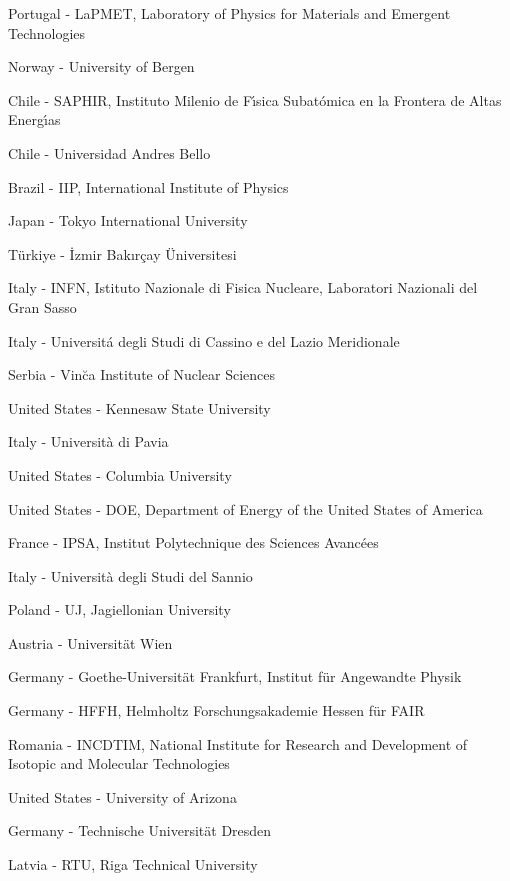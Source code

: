 \item[$^{339}$] Portugal - LaPMET, Laboratory of Physics for Materials and Emergent Technologies
\item[$^{340}$] Norway - University of Bergen
\item[$^{341}$] Chile - SAPHIR, Instituto Milenio de F{\'\i}sica Subat{\'o}mica en la Frontera de Altas Energ{\'\i}as
\item[$^{342}$] Chile - Universidad Andres Bello
\item[$^{343}$] Brazil - IIP, International Institute of Physics
\item[$^{344}$] Japan - Tokyo International University
\item[$^{345}$] T{\"u}rkiye - {\.{I}}zmir Bak{\i }r{\c c}ay {\"U}niversitesi
\item[$^{346}$] Italy - INFN, Istituto Nazionale di Fisica Nucleare, Laboratori Nazionali del Gran Sasso
\item[$^{347}$] Italy - Universit{\'a} degli Studi di Cassino e del Lazio Meridionale
\item[$^{348}$] Serbia - Vin{\u{c}}a Institute of Nuclear Sciences
\item[$^{349}$] United States - Kennesaw State University
\item[$^{350}$] Italy - Universit{\`a} di Pavia
\item[$^{351}$] United States - Columbia University
\item[$^{352}$] United States - DOE, Department of Energy of the United States of America
\item[$^{353}$] France - IPSA, Institut Polytechnique des Sciences Avanc{\'e}es 
\item[$^{354}$] Italy - Universit{\`a} degli Studi del Sannio
\item[$^{355}$] Poland - UJ, Jagiellonian University
\item[$^{356}$] Austria - Universit{\"a}t Wien
\item[$^{357}$] Germany - Goethe-Universit{\"a}t Frankfurt, Institut f{\"u}r Angewandte Physik
\item[$^{358}$] Germany - HFFH, Helmholtz Forschungsakademie Hessen f{\"u}r FAIR
\item[$^{359}$] Romania - INCDTIM, National Institute for Research and Development of Isotopic and Molecular Technologies
\item[$^{360}$] United States - University of Arizona
\item[$^{361}$] Germany - Technische Universit{\"a}t Dresden
\item[$^{362}$] Latvia - RTU, Riga Technical University
